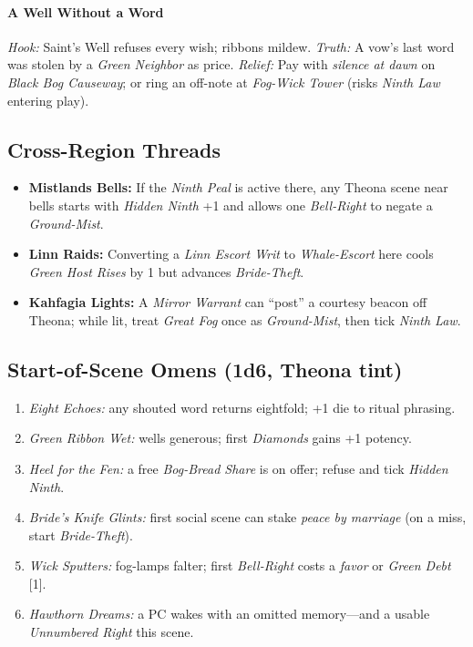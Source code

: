 \paragraph{A Well Without a Word}
\emph{Hook:} Saint’s Well refuses every wish; ribbons mildew.  
\emph{Truth:} A vow’s last word was stolen by a \emph{Green Neighbor} as price.  
\emph{Relief:} Pay with \emph{silence at dawn} on \emph{Black Bog Causeway}; or ring an off-note at \emph{Fog-Wick Tower} (risks \emph{Ninth Law} entering play).

\subsection*{Cross-Region Threads}
\begin{itemize}
  \item \textbf{Mistlands Bells:} If the \emph{Ninth Peal} is active there, any Theona scene near bells starts with \emph{Hidden Ninth} +1 and allows one \emph{Bell-Right} to negate a \emph{Ground-Mist}. 
  \item \textbf{Linn Raids:} Converting a \emph{Linn Escort Writ} to \emph{Whale-Escort} here cools \emph{Green Host Rises} by 1 but advances \emph{Bride-Theft}. 
  \item \textbf{Kahfagia Lights:} A \emph{Mirror Warrant} can “post” a courtesy beacon off Theona; while lit, treat \emph{Great Fog} once as \emph{Ground-Mist}, then tick \emph{Ninth Law}.
\end{itemize}

\subsection*{Start-of-Scene Omens (1d6, Theona tint)}
\begin{enumerate}
  \item \emph{Eight Echoes:} any shouted word returns eightfold; +1 die to ritual phrasing. 
  \item \emph{Green Ribbon Wet:} wells generous; first \emph{Diamonds} gains +1 potency. 
  \item \emph{Heel for the Fen:} a free \emph{Bog-Bread Share} is on offer; refuse and tick \emph{Hidden Ninth}. 
  \item \emph{Bride’s Knife Glints:} first social scene can stake \emph{peace by marriage} (on a miss, start \emph{Bride-Theft}). 
  \item \emph{Wick Sputters:} fog-lamps falter; first \emph{Bell-Right} costs a \emph{favor} or \emph{Green Debt} [1]. 
  \item \emph{Hawthorn Dreams:} a PC wakes with an omitted memory—and a usable \emph{Unnumbered Right} this scene.
\end{enumerate}

